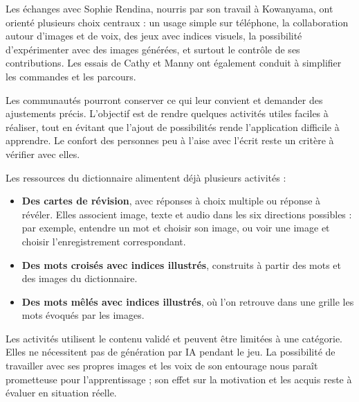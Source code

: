 \documentclass[11pt,a4paper]{article}
\newcommand{\rubrique}[1]{\vspace{5pt}{\large\bfseries\textcolor{accent}{#1}\par}\vspace{2pt}}
\begin{document}
\rubrique{Un outil façonné par les échanges avec les communautés}
Les échanges avec Sophie Rendina, nourris par son travail à Kowanyama, ont orienté
plusieurs choix centraux : un usage simple sur téléphone, la collaboration autour
d'images et de voix, des jeux avec indices visuels, la possibilité d'expérimenter
avec des images générées, et surtout le contrôle de ses contributions. Les essais
de Cathy et Manny ont également conduit à simplifier les commandes et les parcours.

Les communautés pourront conserver ce qui leur convient et demander des
ajustements précis. L'objectif est de rendre quelques activités utiles faciles à
réaliser, tout en évitant que l'ajout de possibilités rende l'application difficile
à apprendre. Le confort des personnes peu à l'aise avec l'écrit reste un critère
à vérifier avec elles.

\newpage
\rubrique{Utiliser les images et les voix pour apprendre}
Les ressources du dictionnaire alimentent déjà plusieurs activités :
\begin{itemize}
\item \textbf{Des cartes de révision}, avec réponses à choix multiple ou réponse
à révéler. Elles associent image, texte et audio dans les six directions possibles :
par exemple, entendre un mot et choisir son image, ou voir une image et choisir
l'enregistrement correspondant.
\item \textbf{Des mots croisés avec indices illustrés}, construits à partir des
mots et des images du dictionnaire.
\item \textbf{Des mots mêlés avec indices illustrés}, où l'on retrouve dans une
grille les mots évoqués par les images.
\end{itemize}
Les activités utilisent le contenu validé et peuvent être limitées à une catégorie.
Elles ne nécessitent pas de génération par IA pendant le jeu. La possibilité de
travailler avec ses propres images et les voix de son entourage nous paraît
prometteuse pour l'apprentissage ; son effet sur la motivation et les acquis reste
à évaluer en situation réelle.
\end{document}
